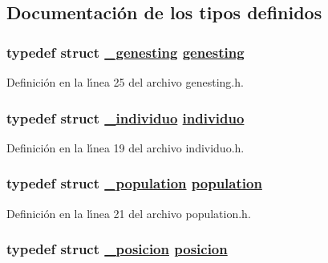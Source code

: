 \subsection{Documentaci\'{o}n de los tipos definidos}
\hypertarget{group__genetic_gcd77cefe71c44c38745a4f148c7a69eb_gcd77cefe71c44c38745a4f148c7a69eb}{
\subsubsection[genesting]{\setlength{\rightskip}{0pt plus 5cm}typedef struct \hyperlink{struct__genesting}{\_\-genesting} \hyperlink{struct__genesting}{genesting}}}
\label{group__genetic_gcd77cefe71c44c38745a4f148c7a69eb_gcd77cefe71c44c38745a4f148c7a69eb}




Definici\'{o}n en la l\'{\i}nea 25 del archivo genesting.h.\hypertarget{group__genetic_g86fcc12a3e2577bedca3b8364e722da3_g86fcc12a3e2577bedca3b8364e722da3}{
\subsubsection[individuo]{\setlength{\rightskip}{0pt plus 5cm}typedef struct \hyperlink{struct__individuo}{\_\-individuo} \hyperlink{struct__individuo}{individuo}}}
\label{group__genetic_g86fcc12a3e2577bedca3b8364e722da3_g86fcc12a3e2577bedca3b8364e722da3}




Definici\'{o}n en la l\'{\i}nea 19 del archivo individuo.h.\hypertarget{group__genetic_gdc93697b2d7197da72db59932b540a07_gdc93697b2d7197da72db59932b540a07}{
\subsubsection[population]{\setlength{\rightskip}{0pt plus 5cm}typedef struct \hyperlink{struct__population}{\_\-population} \hyperlink{struct__population}{population}}}
\label{group__genetic_gdc93697b2d7197da72db59932b540a07_gdc93697b2d7197da72db59932b540a07}




Definici\'{o}n en la l\'{\i}nea 21 del archivo population.h.\hypertarget{group__genetic_ge2fa8f912ec24aab702abf9b76489462_ge2fa8f912ec24aab702abf9b76489462}{
\subsubsection[posicion]{\setlength{\rightskip}{0pt plus 5cm}typedef struct \hyperlink{struct__posicion}{\_\-posicion} \hyperlink{struct__posicion}{posicion}}}
\label{group__genetic_ge2fa8f912ec24aab702abf9b76489462_ge2fa8f912ec24aab702abf9b76489462}




